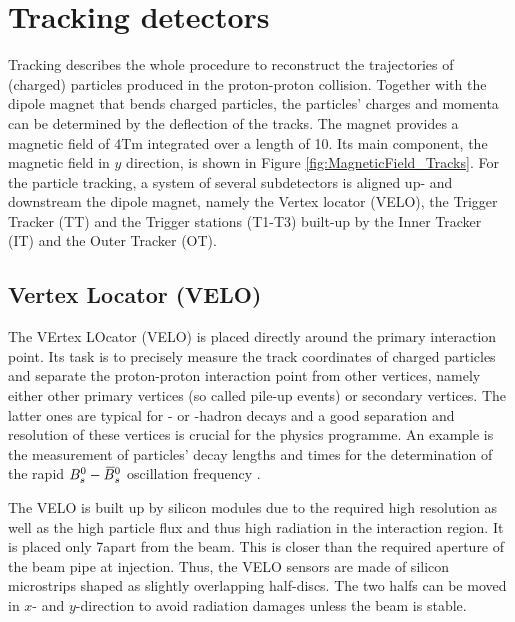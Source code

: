 \section{Tracking detectors}
Tracking describes the whole procedure to reconstruct the trajectories of (charged) particles produced in the proton-proton collision. 
Together with the dipole magnet that bends charged particles, the particles' charges and momenta can be determined by the deflection of the tracks.
The magnet provides a magnetic field of 4\unit{Tm} integrated over a length of 10\m.
Its main component, the magnetic field in $y$ direction, is shown in Figure \ref{fig:MagneticField_Tracks}.
For the particle tracking, a system of several subdetectors is aligned up- and downstream the dipole magnet, namely the Vertex locator (VELO), the Trigger Tracker (TT) and the Trigger stations (T1-T3) built-up by the Inner Tracker (IT) and the Outer Tracker (OT).

\subsection{Vertex Locator (VELO)}
The VErtex LOcator (VELO) is placed directly around the primary interaction point. 
Its task is to precisely measure the track coordinates of charged particles and separate the proton-proton interaction point from other vertices, namely either other primary vertices (so called pile-up events) or secondary vertices. 
The latter ones are typical for \bquark- or \cquark-hadron decays \cite{VELO_TDR} and a good separation and resolution of these vertices is crucial for the \lhcb physics programme.
An example is the measurement of particles' decay lengths and times for the determination of the rapid ${{B}^0_{s}}-{{\kern 0.18em\overline{\kern -0.18em B}{}}{}^0_{s}}$ oscillation frequency \cite{BsBsbar_frequency}.

The VELO is built up by silicon modules due to the required high resolution as well as the high particle flux and thus high radiation in the interaction region. 
It is placed only 7\mm apart from the beam. 
This is closer than the required aperture of the \lhcb beam pipe at injection. 
Thus, the VELO sensors are made of silicon microstrips shaped as slightly overlapping half-discs. 
The two halfs can be moved in $x$- and $y$-direction to avoid radiation damages unless the beam is stable.

